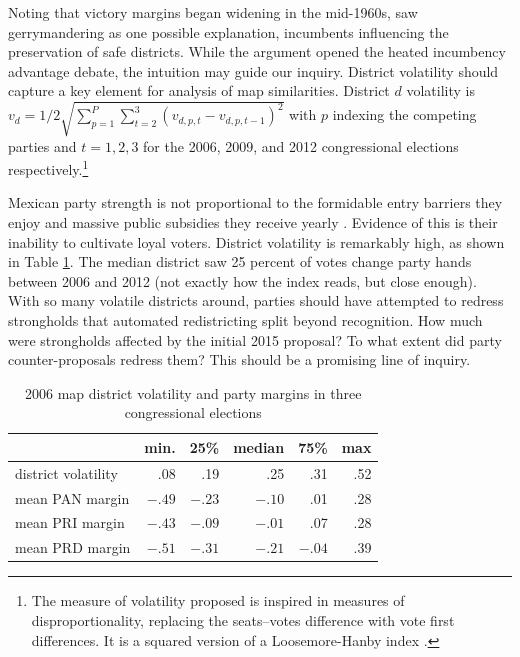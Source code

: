\documentclass[letter,12pt]{article}
\begin{document}
Noting that victory margins began widening in the mid-1960s, \citet{mayhew1974vanishingMg} saw gerrymandering as one possible explanation, incumbents influencing the preservation of safe districts. While the argument opened the heated incumbency advantage debate, the intuition may guide our inquiry. District volatility should capture a key element for analysis of map similarities. District $d$ volatility is $v_d = 1/2 \sqrt{ \sum_{p=1}^P \sum_{t=2}^3 (v_{d,p,t}- v_{d,p,t-1})^2 }$ with $p$ indexing the competing parties and $t=1,2,3$ for the 2006,  2009, and 2012 congressional elections respectively.\footnote{The measure of volatility proposed is inspired in measures of disproportionality, replacing the seats--votes difference with vote first differences. It is a squared version of a Loosemore-Hanby index \citep{loosemore.hanbyDisproportionality1971,gallagherDisproportionality1991}.} 

Mexican party strength is not proportional to the formidable entry barriers they enjoy and massive public subsidies they receive yearly \citep{magar.2007ref.2015}. Evidence of this is their inability to cultivate loyal voters. District volatility is remarkably high, as shown in Table \ref{T:volatMarginsd0}. The median district saw 25 percent of votes change party hands between 2006 and 2012 (not exactly how the index reads, but close enough). With so many volatile districts around, parties should have attempted to redress strongholds that automated redistricting split beyond recognition. How much were strongholds affected by the initial 2015 proposal? To what extent did party counter-proposals redress them? This should be a promising line of inquiry. 

\begin{table}
\begin{center}
\begin{tabular}{lrrrrr}
                    &  min.   &  25\%   & median  & 75\%   & max \\ \hline
district volatility &  .08    & .19     & .25     & .31    & .52 \\
mean PAN margin     &  $-.49$ & $-.23$  & $-.10$  & .01    & .28 \\   
mean PRI margin     &  $-.43$ & $-.09$  & $-.01$  & .07    & .28 \\   
mean PRD margin     &  $-.51$ & $-.31$  & $-.21$  & $-.04$ & .39 \\
\end{tabular}
\caption{2006 map district volatility and party margins in three congressional elections}\label{T:volatMarginsd0}
\end{center}
\end{table}
\end{document}
